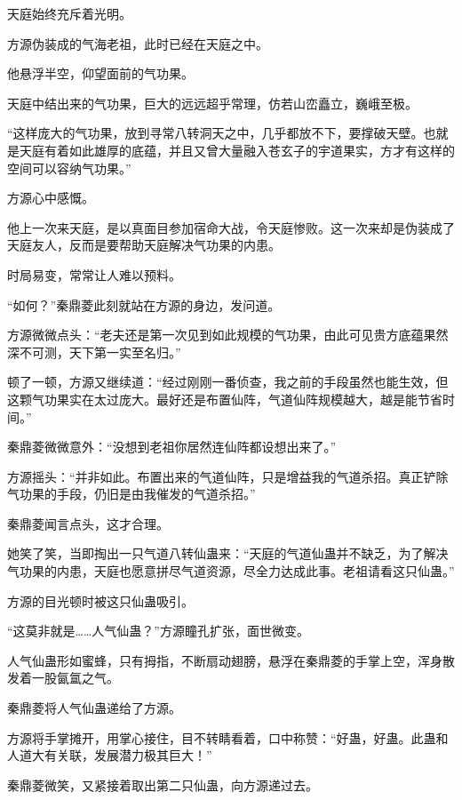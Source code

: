 
\begin{this_body}



天庭始终充斥着光明。

方源伪装成的气海老祖，此时已经在天庭之中。

他悬浮半空，仰望面前的气功果。

天庭中结出来的气功果，巨大的远远超乎常理，仿若山峦矗立，巍峨至极。

“这样庞大的气功果，放到寻常八转洞天之中，几乎都放不下，要撑破天壁。也就是天庭有着如此雄厚的底蕴，并且又曾大量融入苍玄子的宇道果实，方才有这样的空间可以容纳气功果。”

方源心中感慨。

他上一次来天庭，是以真面目参加宿命大战，令天庭惨败。这一次来却是伪装成了天庭友人，反而是要帮助天庭解决气功果的内患。

时局易变，常常让人难以预料。

“如何？”秦鼎菱此刻就站在方源的身边，发问道。

方源微微点头：“老夫还是第一次见到如此规模的气功果，由此可见贵方底蕴果然深不可测，天下第一实至名归。”

顿了一顿，方源又继续道：“经过刚刚一番侦查，我之前的手段虽然也能生效，但这颗气功果实在太过庞大。最好还是布置仙阵，气道仙阵规模越大，越是能节省时间。”

秦鼎菱微微意外：“没想到老祖你居然连仙阵都设想出来了。”

方源摇头：“并非如此。布置出来的气道仙阵，只是增益我的气道杀招。真正铲除气功果的手段，仍旧是由我催发的气道杀招。”

秦鼎菱闻言点头，这才合理。

她笑了笑，当即掏出一只气道八转仙蛊来：“天庭的气道仙蛊并不缺乏，为了解决气功果的内患，天庭也愿意拼尽气道资源，尽全力达成此事。老祖请看这只仙蛊。”

方源的目光顿时被这只仙蛊吸引。

“这莫非就是……人气仙蛊？”方源瞳孔扩张，面世微变。

人气仙蛊形如蜜蜂，只有拇指，不断扇动翅膀，悬浮在秦鼎菱的手掌上空，浑身散发着一股氤氲之气。

秦鼎菱将人气仙蛊递给了方源。

方源将手掌摊开，用掌心接住，目不转睛看着，口中称赞：“好蛊，好蛊。此蛊和人道大有关联，发展潜力极其巨大！”

秦鼎菱微笑，又紧接着取出第二只仙蛊，向方源递过去。


\end{this_body}
